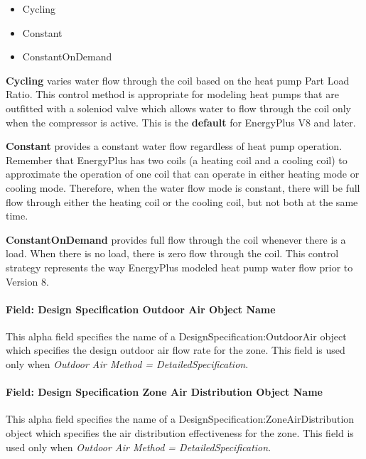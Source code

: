 \begin{itemize}
\item
  Cycling
\item
  Constant
\item
  ConstantOnDemand
\end{itemize}

\textbf{Cycling} varies water flow through the coil based on the heat pump Part Load Ratio. This control method is appropriate for modeling heat pumps that are outfitted with a soleniod valve which allows water to flow through the coil only when the compressor is active. This is the \textbf{default} for EnergyPlus V8 and later.

\textbf{Constant} provides a constant water flow regardless of heat pump operation. Remember that EnergyPlus has two coils (a heating coil and a cooling coil) to approximate the operation of one coil that can operate in either heating mode or cooling mode. Therefore, when the water flow mode is constant, there will be full flow through either the heating coil or the cooling coil, but not both at the same time.

\textbf{ConstantOnDemand} provides full flow through the coil whenever there is a load. When there is no load, there is zero flow through the coil. This control strategy represents the way EnergyPlus modeled heat pump water flow prior to Version 8.

\paragraph{Field: Design Specification Outdoor Air Object Name}\label{field-design-specification-outdoor-air-object-name-5}

This alpha field specifies the name of a DesignSpecification:OutdoorAir object which specifies the design outdoor air flow rate for the zone. This field is used only when \emph{Outdoor Air Method = DetailedSpecification}.

\paragraph{Field: Design Specification Zone Air Distribution Object Name}\label{field-design-specification-zone-air-distribution-object-name-4}

This alpha field specifies the name of a DesignSpecification:ZoneAirDistribution object which specifies the air distribution effectiveness for the zone. This field is used only when \emph{Outdoor Air Method = DetailedSpecification}.

